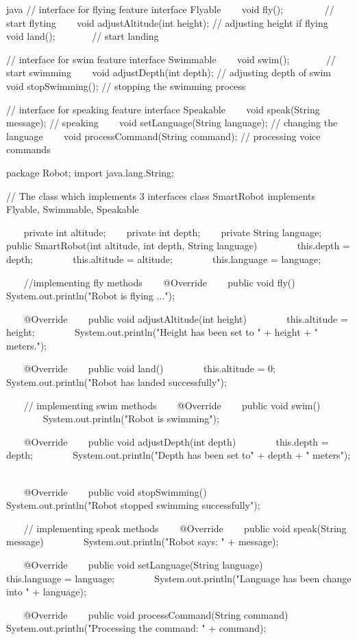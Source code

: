 \begin{codebox}{java}
// interface for flying feature
interface Flyable {
    void fly();         // start flyting
    void adjustAltitude(int height); // adjusting height if flying
    void land();        // start landing
}

// interface for swim feature
interface Swimmable {
    void swim();        // start swimming
    void adjustDepth(int depth); // adjusting depth of swim
    void stopSwimming(); // stopping the swimming process
}

// interface for speaking feature
interface Speakable {
    void speak(String message); // speaking
    void setLanguage(String language); // changing the language
    void processCommand(String command); // processing voice commands
}

package Robot;
import java.lang.String;

// The class which implements 3 interfaces
class SmartRobot implements Flyable, Swimmable, Speakable {

    private int altitude;
    private int depth;
    private String language;
    public SmartRobot(int altitude, int depth, String language){
        this.depth = depth;
        this.altitude = altitude;
        this.language = language;  
    }

    //implementing fly methods
    @Override
    public void fly() {  
        System.out.println("Robot is flying ...");  
    }

    @Override
    public void adjustAltitude(int height) {
        this.altitude = height;  
        System.out.println("Height has been set to " + height + " meters.");  
    }

    @Override
    public void land() {
        this.altitude = 0;  
        System.out.println("Robot has landed successfully");  
    }

    // implementing swim methods
    @Override
    public void swim() {  
        System.out.println("Robot is swimming");  
    }

    @Override
    public void adjustDepth(int depth) {
        this.depth = depth;  
        System.out.println("Depth has been set to" + depth + " meters");  
    }

    @Override
    public void stopSwimming() {  
        System.out.println("Robot stopped swimming successfully");  
    }

    // implementing speak methods
    @Override
    public void speak(String message) {  
        System.out.println("Robot says: " + message);  
    }

    @Override
    public void setLanguage(String language) {
        this.language = language;  
        System.out.println("Language has been change into " + language);  
    }

    @Override
    public void processCommand(String command) {  
        System.out.println("Processing the command: " + command);  
    }  
}
\end{codebox}

